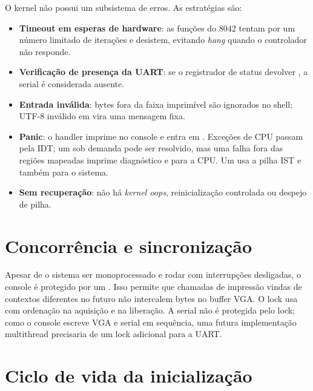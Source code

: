 O kernel n\~ao possui um subsistema de erros. As estrat\'egias s\~ao:

\begin{itemize}
  \item \textbf{Timeout em esperas de hardware}: as fun\c{c}\~oes do 8042
        tentam por um n\'umero limitado de itera\c{c}\~oes e desistem, evitando
        \emph{hang} quando o controlador n\~ao responde.
  \item \textbf{Verifica\c{c}\~ao de presen\c{c}a da UART}: se o registrador de
        status devolver , a serial \'e considerada ausente.
  \item \textbf{Entrada inv\'alida}: bytes fora da faixa imprim\'ivel s\~ao
        ignorados no shell; UTF-8 inv\'alido em  vira uma
        mensagem fixa.
  \item \textbf{Panic}: o handler imprime \code{[PANIC]} no console e entra em
        . Exce\c{c}\~oes de CPU passam pela IDT; um
         sob demanda pode ser resolvido, mas uma falha fora das
        regi\~oes mapeadas imprime diagn\'ostico e para a CPU. Um
         usa a pilha IST e tamb\'em para o sistema.
  \item \textbf{Sem recupera\c{c}\~ao}: n\~ao h\'a \emph{kernel oops},
        reinicializa\c{c}\~ao controlada ou despejo de pilha.
\end{itemize}

\section{Concorr\^encia e sincroniza\c{c}\~ao}

Apesar de o sistema ser monoprocessado e rodar com interrup\c{c}\~oes
desligadas, o console \'e protegido por um . Isso permite que
chamadas de impress\~ao vindas de contextos diferentes no futuro n\~ao
intercalem bytes no buffer VGA. O lock usa  com
ordena\c{c}\~ao  na aquisi\c{c}\~ao e  na
libera\c{c}\~ao. A serial n\~ao \'e protegida pelo lock; como o console
escreve VGA e serial em sequ\^encia, uma futura implementa\c{c}\~ao
multithread precisaria de um lock adicional para a UART.

\section{Ciclo de vida da inicializa\c{c}\~ao}

